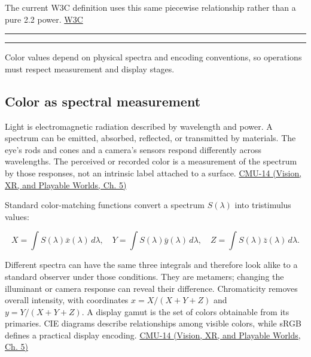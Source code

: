 The current W3C definition uses this same piecewise relationship rather than a pure 2.2 power. \href{https://www.w3.org/TR/2026/CRD-css-color-4-20261009/?utm_source=chatgpt.com}{W3C}

\begin{center}\rule{0.5\linewidth}{0.5pt}\end{center}

\begin{center}\rule{0.5\linewidth}{0.5pt}\end{center}

Color values depend on physical spectra and encoding conventions, so operations must respect measurement and display stages.

\subsection{Color as spectral measurement}\label{03-visual-computing-i-ch004-color-as-spectral-measurement}

\hypertarget{03-visual-computing-i-ch004-color-as-spectral-measurement}{}

Light is electromagnetic radiation described by wavelength and power. A spectrum can be emitted, absorbed, reflected, or transmitted by materials. The eye's rods and cones and a camera's sensors respond differently across wavelengths. The perceived or recorded color is a measurement of the spectrum by those responses, not an intrinsic label attached to a surface. \href{../07-Vision-XR-and-Playable-Worlds/main.pdf\#nameddest=04-visual-computing-ii-ch036-cmu-14---color}{CMU-14 (Vision, XR, and Playable Worlds, Ch. 5)}

Standard color-matching functions convert a spectrum \(S(\lambda)\) into tristimulus values:

\[
X=\int S(\lambda)\bar x(\lambda)\,d\lambda,\quad
Y=\int S(\lambda)\bar y(\lambda)\,d\lambda,\quad
Z=\int S(\lambda)\bar z(\lambda)\,d\lambda.
\]

Different spectra can have the same three integrals and therefore look alike to a standard observer under those conditions. They are metamers; changing the illuminant or camera response can reveal their difference. Chromaticity removes overall intensity, with coordinates \(x=X/(X+Y+Z)\) and \(y=Y/(X+Y+Z)\). A display gamut is the set of colors obtainable from its primaries. CIE diagrams describe relationships among visible colors, while sRGB defines a practical display encoding. \href{../07-Vision-XR-and-Playable-Worlds/main.pdf\#nameddest=04-visual-computing-ii-ch036-cmu-14---color}{CMU-14 (Vision, XR, and Playable Worlds, Ch. 5)}

